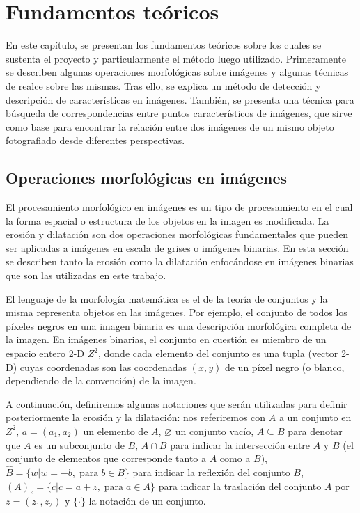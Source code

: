 \chapter{Fundamentos teóricos}
\label{c:parte3}
\vspace{1cm}
En este capítulo, se presentan los fundamentos teóricos sobre los cuales se sustenta el proyecto y particularmente el método luego utilizado. Primeramente se describen algunas operaciones morfológicas sobre imágenes y algunas técnicas de realce sobre las mismas. Tras ello, se explica un método de detección y descripción de características en imágenes. También, se presenta una técnica para búsqueda de correspondencias entre puntos característicos de imágenes, que sirve como base para encontrar la relación entre dos imágenes de un mismo objeto fotografiado desde diferentes perspectivas.
\section{Operaciones morfológicas en imágenes}
El procesamiento morfológico en imágenes es un tipo de procesamiento en el cual la forma espacial o estructura de los objetos en la imagen es modificada. La erosión y dilatación son dos operaciones morfológicas fundamentales que pueden ser aplicadas a imágenes en escala de grises o imágenes binarias. En esta sección se describen tanto la erosión como la dilatación enfocándose en imágenes binarias que son las utilizadas en este trabajo.

El lenguaje de la morfología matemática es el de la teoría de conjuntos y la misma representa objetos en las imágenes. Por ejemplo, el conjunto de todos los píxeles negros en una imagen binaria es una descripción morfológica completa de la imagen. En imágenes binarias, el conjunto en cuestión es miembro de un espacio entero 2-D $Z^2$, donde cada elemento del conjunto es una tupla (vector 2-D) cuyas coordenadas son las coordenadas $(x,y)$ de un píxel negro (o blanco, dependiendo de la convención) de la imagen.

A continuación, definiremos algunas notaciones que serán utilizadas para definir posteriormente la erosión y la dilatación: nos referiremos con $A$ a un conjunto en $Z^2$, $a=(a_1,a_2)$ un elemento de $A$, $\varnothing$ un conjunto vacío, $A \subseteq B$ para denotar que $A$ es un subconjunto de $B$,  $A \cap B$ para indicar la intersección entre $A$ y $B$ (el conjunto de elementos que corresponde tanto a $A$ como a $B$), $\hat{B}=\{w|w=-b, \; \textrm{para} \; b \in B\}$ para indicar la reflexión del conjunto $B$,  $(A)_{z}=\{c|c=a+z,\; \textrm{para}\; a \in A\}$ para indicar la traslación del conjunto $A$ por $z=(z_1, z_2)$ y $\{\cdot\}$ la notación de un conjunto.
